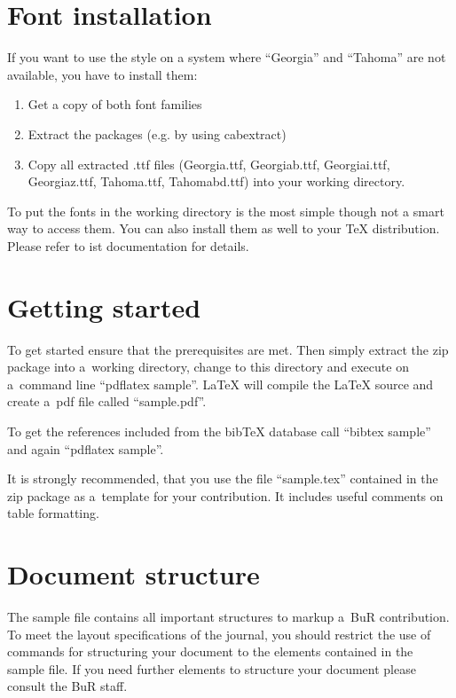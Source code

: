 \documentclass{article}
\begin{document}
\section*{Font installation}

  If you want to use the style on a system where ``Georgia'' and ``Tahoma''
  are not available, you have to install them:
  \begin{enumerate}
    \item Get a copy of both font families\footnotemark
    \item Extract the packages (e.g. by using cabextract)
    \item Copy all extracted .ttf files (Georgia.ttf, Georgiab.ttf,
    Georgiai.ttf, Georgiaz.ttf, Tahoma.ttf, Tahomabd.ttf) into your working
    directory.
  \end{enumerate}
  To put the fonts in the working directory is the most simple though not a
  smart way to access them. You can also install them as well to your TeX
  distribution. Please refer to ist documentation for details.

\section*{Getting started}

  To get started ensure that the prerequisites are met. Then simply extract
  the zip package into a~working directory, change to this directory and
  execute on a~command line ``pdflatex sample''. {\LaTeX} will compile the
  {\LaTeX} source and create a~pdf file called ``sample.pdf''.

  To get the references included from the bib\TeX{} database call ``bibtex
  sample'' and again ``pdflatex sample''.

  It is strongly recommended, that you use the file ``sample.tex'' contained
  in the zip package as a~template for your contribution. It includes useful
  comments on table formatting.

\section*{Document structure}

  The sample file contains all important structures to markup a~BuR
  contribution. To meet the layout specifications of the journal, you should
  restrict the use of commands for structuring your document to the elements
  contained in the sample file. If you need further elements to structure your
  document please consult the BuR staff.
\end{document}

